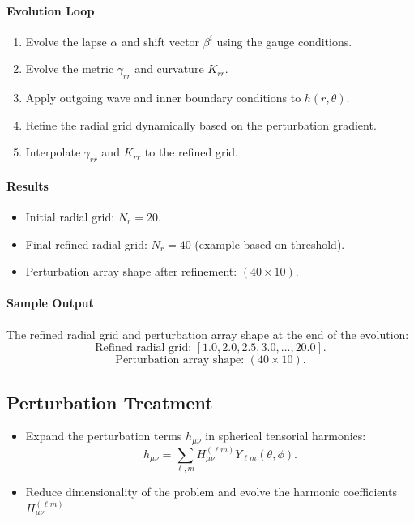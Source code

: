 \documentclass[12pt]{article}
\begin{document}
\paragraph{Evolution Loop}
\begin{enumerate}
    \item Evolve the lapse $\alpha$ and shift vector $\beta^i$ using the gauge conditions.
    \item Evolve the metric $\gamma_{rr}$ and curvature $K_{rr}$.
    \item Apply outgoing wave and inner boundary conditions to $h(r, \theta)$.
    \item Refine the radial grid dynamically based on the perturbation gradient.
    \item Interpolate $\gamma_{rr}$ and $K_{rr}$ to the refined grid.
\end{enumerate}

\paragraph{Results}
\begin{itemize}
    \item Initial radial grid: $N_r = 20$.
    \item Final refined radial grid: $N_r = 40$ (example based on threshold).
    \item Perturbation array shape after refinement: $(40 \times 10)$.
\end{itemize}

\paragraph{Sample Output}
The refined radial grid and perturbation array shape at the end of the evolution:
\[
\text{Refined radial grid: } [1.0, 2.0, 2.5, 3.0, \dots, 20.0].
\]
\[
\text{Perturbation array shape: } (40 \times 10).
\]


\subsection{Perturbation Treatment}
\begin{itemize}
    \item Expand the perturbation terms $h_{\mu\nu}$ in spherical tensorial harmonics:
    \[
    h_{\mu\nu} = \sum_{\ell, m} H_{\mu\nu}^{(\ell m)} Y_{\ell m}(\theta, \phi).
    \]
    \item Reduce dimensionality of the problem and evolve the harmonic coefficients $H_{\mu\nu}^{(\ell m)}$.
\end{itemize}
\end{document}
